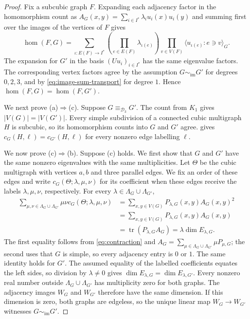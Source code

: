 \documentclass[10pt,a4paper]{article}
\theoremstyle{plain}
\theoremstyle{definition}
\DeclareMathOperator{\tr}{tr}
\begin{document}
\begin{proof}
Fix a subcubic graph $F$. Expanding each adjacency factor in the
homomorphism count as
$A_G(x,y)=\sum_{i\in I^*}\lambda_i u_i(x)u_i(y)$
and summing first over the images of the vertices of $F$ gives
\begin{equation}\label{eq:image-hom-expansion}
 \hom(F,G)=\sum_{\iota:E(F)\to I^*}
 \left(\prod_{e\in E(F)}\lambda_{\iota(e)}\right)
 \prod_{v\in V(F)}\bigl\langle u_{\iota(e)}:e\ni v\bigr\rangle_G.
\end{equation}
The expansion for $G'$ in the basis $(Uu_i)_{i\in I^*}$ has the same
eigenvalue factors. The corresponding vertex factors agree by the
assumption $G\sim_{\mathrm{im}}G'$ for degrees $0,2,3$, and by
\cref{eq:image-sum-transport} for degree $1$.
Hence $\hom(F,G)=\hom(F,G')$.

We next prove (a)$\Rightarrow$(c).
Suppose $G\equiv_{\mathcal D_3}G'$. The count from $K_1$ gives
$|V(G)|=|V(G')|$. Every simple subdivision of a connected cubic multigraph $H$ is subcubic,
so its homomorphism counts into $G$ and $G'$ agree.
 gives
$c_G(H,\ell)=c_{G'}(H,\ell)$ for every nonzero edge labelling $\ell$.

We now prove (c)$\Rightarrow$(b). Suppose (c) holds.
We first show that $G$ and $G'$ have the same nonzero eigenvalues with
the same multiplicities. Let $\Theta$ be the cubic multigraph with
vertices $a,b$ and three parallel edges. We fix an order of these edges and write
$c_G(\Theta;\lambda,\mu,\nu)$ for its coefficient when these edges
receive the labels $\lambda,\mu,\nu$, respectively.
For every $\lambda\in\Lambda_G\cup\Lambda_{G'}$,
\begin{equation}\label{eq:theta-multiplicity}
 \begin{aligned}
 \sum_{\mu,\nu\in\Lambda_G\cup\Lambda_{G'}}\mu\nu c_G(\Theta;\lambda,\mu,\nu)
 &=\sum_{x,y\in V(G)}P_{\lambda,G}(x,y)A_G(x,y)^2\\
 &=\sum_{x,y\in V(G)}P_{\lambda,G}(x,y)A_G(x,y)\\
 &=\tr(P_{\lambda,G}A_G)
 =\lambda\dim E_{\lambda,G}.
 \end{aligned}
\end{equation}
The first equality follows from \cref{eq:contraction} and
$A_G=\sum_{\mu\in\Lambda_G\cup\Lambda_{G'}}\mu P_{\mu,G}$; the second uses that $G$ is
simple, so every adjacency entry is $0$ or $1$.
The same identity holds for $G'$. The assumed equality of the labelled coefficients equates the left sides,
so division by $\lambda\ne0$ gives
$\dim E_{\lambda,G}=\dim E_{\lambda,G'}$.
Every nonzero real number outside $\Lambda_G\cup\Lambda_{G'}$ has multiplicity zero for
both graphs.
The adjacency images $W_G$ and $W_{G'}$ therefore have the same dimension.
If this dimension is zero, both graphs are edgeless, so the unique
linear map $W_G\to W_{G'}$ witnesses $G\sim_{\mathrm{im}}G'$.


\end{proof}
\end{document}
